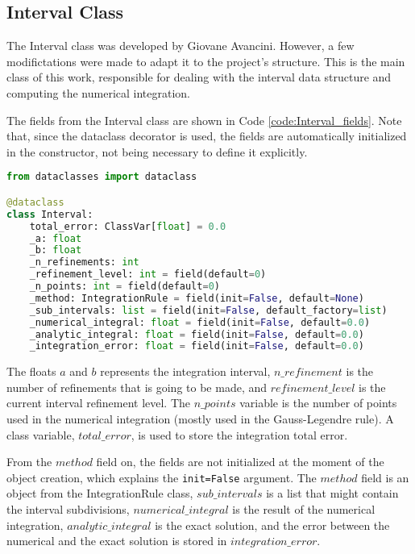 \subsection{Interval Class}
The Interval class was developed by Giovane Avancini. However, a few modifictations were made to adapt it to the project's structure. This is the main class of this work, responsible for dealing with the interval data structure and computing the numerical integration.

The fields from the Interval class are shown in Code \ref{code:Interval_fields}. Note that, since the dataclass decorator is used, the fields are automatically initialized in the constructor, not being necessary to define it explicitly.
\begin{lstlisting}[language=python, caption={Interval class fields.}, label={code:Interval_fields}]
from dataclasses import dataclass

@dataclass
class Interval:
    total_error: ClassVar[float] = 0.0
    _a: float
    _b: float
    _n_refinements: int
    _refinement_level: int = field(default=0)
    _n_points: int = field(default=0)
    _method: IntegrationRule = field(init=False, default=None)
    _sub_intervals: list = field(init=False, default_factory=list)
    _numerical_integral: float = field(init=False, default=0.0)
    _analytic_integral: float = field(init=False, default=0.0)
    _integration_error: float = field(init=False, default=0.0)
\end{lstlisting}

The floats $a$ and $b$ represents the integration interval, $n\_refinement$ is the number of refinements that is going to be made, and ${refinement\_level}$ is the current interval refinement level. The $n\_points$ variable is the number of points used in the numerical integration (mostly used in the Gauss-Legendre rule). A class variable, $total\_error$, is used to store the integration total error.

From the $method$ field on, the fields are not initialized at the moment of the object creation, which explains the \texttt{init=False} argument. The $method$ field is an object from the IntegrationRule class, $sub\_intervals$ is a list that might contain the interval subdivisions, $numerical\_integral$ is the result of the numerical integration, $analytic\_integral$ is the exact solution, and the error between the numerical and the exact solution is stored in $integration\_error$.

